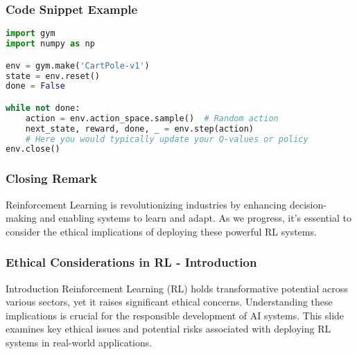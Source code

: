 \documentclass{beamer}
\begin{document}
\begin{frame}[fragile]
    \frametitle{Code Snippet Example}
    \begin{lstlisting}[language=Python]
import gym
import numpy as np

env = gym.make('CartPole-v1')
state = env.reset()
done = False

while not done:
    action = env.action_space.sample()  # Random action
    next_state, reward, done, _ = env.step(action)
    # Here you would typically update your Q-values or policy
env.close()
    \end{lstlisting}
\end{frame}

\begin{frame}
    \frametitle{Closing Remark}
    Reinforcement Learning is revolutionizing industries by enhancing decision-making and enabling systems to learn and adapt. As we progress, it's essential to consider the ethical implications of deploying these powerful RL systems.
\end{frame}

\begin{frame}[fragile]
    \frametitle{Ethical Considerations in RL - Introduction}
    \begin{block}{Introduction}
        Reinforcement Learning (RL) holds transformative potential across various sectors, yet it raises significant ethical concerns. Understanding these implications is crucial for the responsible development of AI systems. This slide examines key ethical issues and potential risks associated with deploying RL systems in real-world applications.
    \end{block}
\end{frame}
\end{document}
